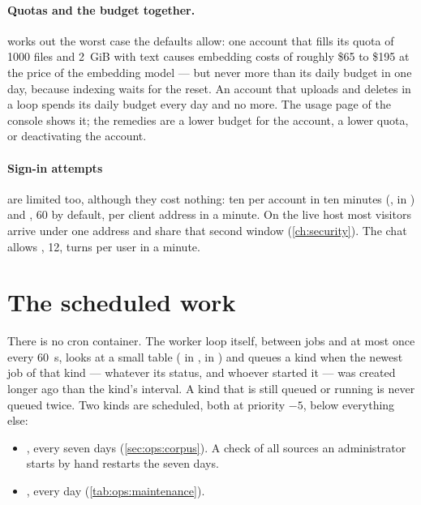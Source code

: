 \paragraph{Quotas and the budget together.}  works out the worst case
the defaults allow: one account that fills its quota of 1000 files and 2~GiB with text causes
embedding costs of roughly \$65 to \$195 at the price of the embedding model --- but never
more than its daily budget in one day, because indexing waits for the reset. An account that
uploads and deletes in a loop spends its daily budget every day and no more. The usage page of
the console shows it; the remedies are a lower budget for the account, a lower quota, or
deactivating the account.

\paragraph{Sign-in attempts} are limited too, although they cost nothing: ten per account in
ten minutes (,  in ) and
, 60 by default, per client address in a minute. On the live host
most visitors arrive under one address and share that second window (\cref{ch:security}). The
chat allows
, 12, turns per user in a minute.


\section{The scheduled work}\label{sec:ops:schedule}

There is no cron container. The worker loop itself, between jobs and at most once every
60~s, looks at a small table ( in ,
 in ) and queues a kind when
the newest job of that kind --- whatever its status, and whoever started it --- was created
longer ago than the kind's interval. A kind that is still queued or running is never queued
twice. Two kinds are scheduled, both at priority $-5$, below everything else:

\begin{itemize}
  \item {}, every seven days (\cref{sec:ops:corpus}). A check of all
    sources an administrator starts by hand restarts the seven days.
  \item {}, every day (\cref{tab:ops:maintenance}).
\end{itemize}

